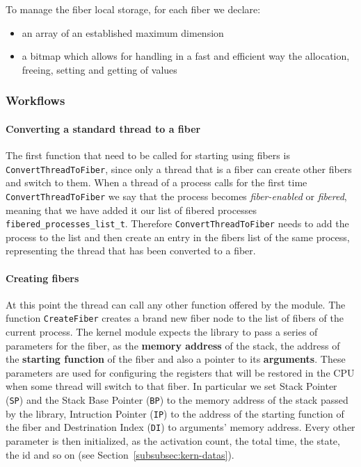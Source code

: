 \documentclass[a4paper,10pt]{article}
\begin{document}
To manage the fiber local storage, for each fiber we declare:
\begin{itemize}
	\item an array of an established maximum dimension
	\item a bitmap which allows for handling in a fast and efficient way the allocation, freeing, setting and getting of values
\end{itemize}

\subsubsection{Workflows}
\paragraph{Converting a standard thread to a fiber}
The first function that need to be called for starting using fibers is \lstinline{ConvertThreadToFiber}, since only a thread that is a fiber can create other fibers and switch to them. When a thread of a process calls for the first time \lstinline{ConvertThreadToFiber} we say that the process becomes \textit{fiber-enabled} or \textit{fibered}, meaning that we have added it our list of fibered processes \lstinline{fibered_processes_list_t}. Therefore \lstinline{ConvertThreadToFiber} needs to add the process to the list and then create an entry in the fibers list of the same process, representing the thread that has been converted to a fiber.

\paragraph{Creating fibers}
At this point the thread can call any other function offered by the module. The function \lstinline{CreateFiber} creates a brand new fiber node to the list of fibers of the current process. The kernel module expects the library to pass a series of parameters for the fiber, as the \textbf{memory address} of the stack, the address of the \textbf{starting function} of the fiber and also a pointer to its \textbf{arguments}. These parameters are used for configuring the registers that will be restored in the CPU when some thread will switch to that fiber. In particular we set Stack Pointer (\texttt{SP}) and the Stack Base Pointer (\texttt{BP}) to the memory address of the stack passed by the library, Intruction Pointer (\texttt{IP}) to the address of the starting function of the fiber and Destrination Index (\texttt{DI}) to arguments’ memory address. Every other parameter is then initialized, as the activation count, the total time, the state, the id and so on (see Section~\ref{subsubsec:kern-datas}).
\end{document}
